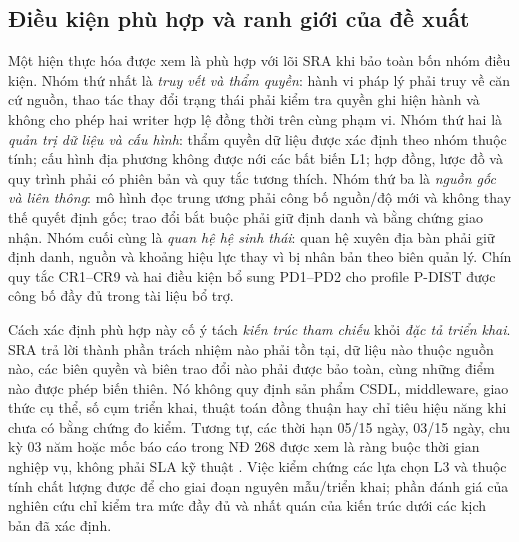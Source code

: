 \subsection{Điều kiện phù hợp và ranh giới của đề xuất}
\label{subsec:conformance}

Một hiện thực hóa được xem là phù hợp với lõi SRA khi bảo toàn bốn nhóm điều kiện. Nhóm thứ nhất là \emph{truy vết và thẩm quyền}: hành vi pháp lý phải truy về căn cứ nguồn, thao tác thay đổi trạng thái phải kiểm tra quyền ghi hiện hành và không cho phép hai writer hợp lệ đồng thời trên cùng phạm vi. Nhóm thứ hai là \emph{quản trị dữ liệu và cấu hình}: thẩm quyền dữ liệu được xác định theo nhóm thuộc tính; cấu hình địa phương không được nới các bất biến L1; hợp đồng, lược đồ và quy trình phải có phiên bản và quy tắc tương thích. Nhóm thứ ba là \emph{nguồn gốc và liên thông}: mô hình đọc trung ương phải công bố nguồn/độ mới và không thay thế quyết định gốc; trao đổi bắt buộc phải giữ định danh và bằng chứng giao nhận. Nhóm cuối cùng là \emph{quan hệ hệ sinh thái}: quan hệ xuyên địa bàn phải giữ định danh, nguồn và khoảng hiệu lực thay vì bị nhân bản theo biên quản lý. Chín quy tắc CR1--CR9 và hai điều kiện bổ sung PD1--PD2 cho profile P-DIST được công bố đầy đủ trong tài liệu bổ trợ.

Cách xác định phù hợp này cố ý tách \emph{kiến trúc tham chiếu} khỏi \emph{đặc tả triển khai}. SRA trả lời thành phần trách nhiệm nào phải tồn tại, dữ liệu nào thuộc nguồn nào, các biên quyền và biên trao đổi nào phải được bảo toàn, cùng những điểm nào được phép biến thiên. Nó không quy định sản phẩm CSDL, middleware, giao thức cụ thể, số cụm triển khai, thuật toán đồng thuận hay chỉ tiêu hiệu năng khi chưa có bằng chứng đo kiểm. Tương tự, các thời hạn 05/15 ngày, 03/15 ngày, chu kỳ 03 năm hoặc mốc báo cáo trong NĐ 268 được xem là ràng buộc thời gian nghiệp vụ, không phải SLA kỹ thuật \citep{nd268_2025}. Việc kiểm chứng các lựa chọn L3 và thuộc tính chất lượng được để cho giai đoạn nguyên mẫu/triển khai; phần đánh giá của nghiên cứu chỉ kiểm tra mức đầy đủ và nhất quán của kiến trúc dưới các kịch bản đã xác định.
